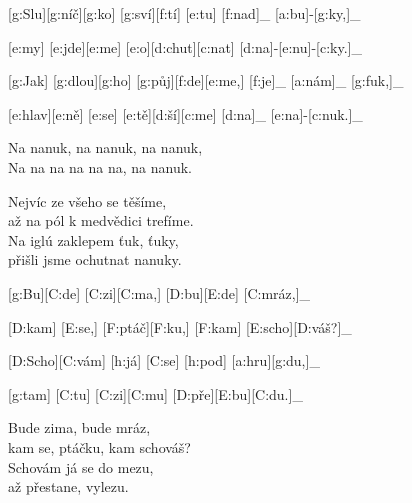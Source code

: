 
[g:Slu][g:níč][g:ko] [g:sví][f:tí] [e:tu] [f:nad]_ [a:bu]-[g:ky,]_

[e:my] [e:jde][e:me] [e:o][d:chut][c:nat] [d:na]-[e:nu]-[c:ky.]_

[g:Jak] [g:dlou][g:ho] [g:půj][f:de][e:me,] [f:je]_ [a:nám]_ [g:fuk,]_

[e:hlav][e:ně] [e:se] [e:tě][d:ší][c:me] [d:na]_ [e:na]-[c:nuk.]_

Na nanuk, na nanuk, na nanuk,\\
Na na na na na na, na nanuk.

Nejvíc ze všeho se těšíme,\\
až na pól k medvědici trefíme.\\
Na iglú zaklepem ťuk, ťuky,\\
přišli jsme ochutnat nanuky.



[g:Bu][C:de] [C:zi][C:ma,] [D:bu][E:de] [C:mráz,]_

[D:kam] [E:se,] [F:ptáč][F:ku,] [F:kam] [E:scho][D:váš?]_

[D:Scho][C:vám] [h:já] [C:se] [h:pod] [a:hru][g:du,]_

[g:tam] [C:tu] [C:zi][C:mu] [D:pře][E:bu][C:du.]_

Bude zima, bude mráz,\\
kam se, ptáčku, kam schováš?\\
Schovám já se do mezu,\\
až přestane, vylezu.\\


\bye
